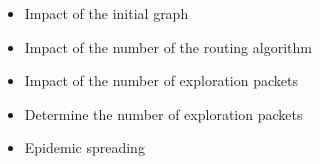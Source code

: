 \begin{itemize}
	\item Impact of the initial graph
	\item Impact of the number of the routing algorithm
	\item Impact of the number of exploration packets
	\item Determine the number of exploration packets	
	\item Epidemic spreading
\end{itemize}
